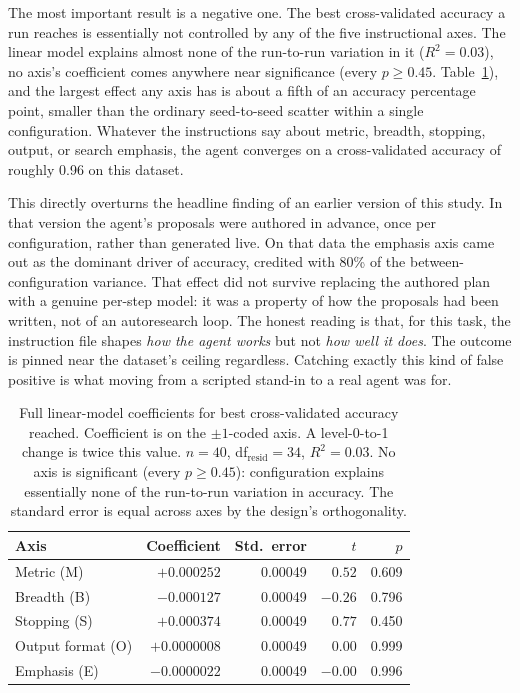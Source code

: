 \documentclass[11pt]{article}
\begin{document}
The most important result is a negative one. The best cross-validated accuracy a run reaches is essentially not controlled by any of the five instructional axes. The linear model explains almost none of the run-to-run variation in it ($R^2=0.03$), no axis's coefficient comes anywhere near significance (every $p\ge0.45$. Table~\ref{tab:coef-accuracy}), and the largest effect any axis has is about a fifth of an accuracy percentage point, smaller than the ordinary seed-to-seed scatter within a single configuration. Whatever the instructions say about metric, breadth, stopping, output, or search emphasis, the agent converges on a cross-validated accuracy of roughly 0.96 on this dataset. 

This directly overturns the headline finding of an earlier version of this study. In that version the agent's proposals were authored in advance, once per configuration, rather than generated live. On that data the emphasis axis came out as the dominant driver of accuracy, credited with 80\% of the between-configuration variance. That effect did not survive replacing the authored plan with a genuine per-step model: it was a property of how the proposals had been written, not of an autoresearch loop. The honest reading is that, for this task, the instruction file shapes \emph{how the agent works} but not \emph{how well it does}. The outcome is pinned near the dataset's ceiling regardless. Catching exactly this kind of false positive is what moving from a scripted stand-in to a real agent was for.

\begin{table}[h]
\centering
\caption{Full linear-model coefficients for best cross-validated accuracy reached. Coefficient is on the $\pm1$-coded axis. A level-0-to-1 change is twice this value. $n=40$, df$_{\text{resid}}=34$, $R^2=0.03$. No axis is significant (every $p\ge0.45$): configuration explains essentially none of the run-to-run variation in accuracy. The standard error is equal across axes by the design's orthogonality.}
\label{tab:coef-accuracy}
\begin{tabular}{lrrrr}
\toprule
Axis & Coefficient & Std.\ error & $t$ & $p$ \\
\midrule
Metric (M) & $+0.000252$ & 0.00049 & $0.52$ & 0.609 \\
Breadth (B) & $-0.000127$ & 0.00049 & $-0.26$ & 0.796 \\
Stopping (S) & $+0.000374$ & 0.00049 & $0.77$ & 0.450 \\
Output format (O) & $+0.0000008$ & 0.00049 & $0.00$ & 0.999 \\
Emphasis (E) & $-0.0000022$ & 0.00049 & $-0.00$ & 0.996 \\
\bottomrule
\end{tabular}
\end{table}
\end{document}
